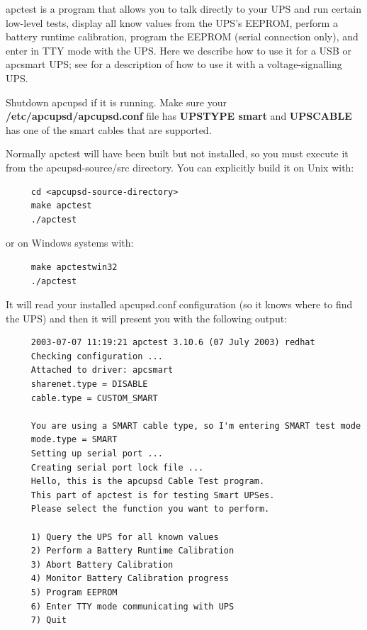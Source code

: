 {{\label{index-apctest-100}
apctest is a program that allows you to talk directly to your UPS and run
certain low-level tests, display all know values from the UPS's EEPROM,
perform a battery runtime calibration, program the EEPROM (serial connection
only), and enter in TTY mode with the UPS. Here we describe how to use it for
a USB or apcsmart UPS; see 
 for a description
of how to use it with a voltage-signalling UPS.  

Shutdown apcupsd if it is running. Make sure your {\bf
/etc/apcupsd/apcupsd.conf} file has {\bf UPSTYPE smart} and {\bf UPSCABLE} has
one of the smart cables that are supported.  

Normally apctest will have been built but not installed, so you must execute
it from the \lt{}apcupsd-source\gt{}/src directory. You can explicitly build
it on Unix with: 

\footnotesize
\begin{verbatim}
     cd <apcupsd-source-directory>
     make apctest
     ./apctest
\end{verbatim}
\normalsize

or on Windows systems with: 

\footnotesize
\begin{verbatim}
     make apctestwin32
     ./apctest
\end{verbatim}
\normalsize

It will read your installed apcupsd.conf configuration (so it knows where to
find the UPS) and then it will present you with the following output: 

\footnotesize
\begin{verbatim}
     2003-07-07 11:19:21 apctest 3.10.6 (07 July 2003) redhat
     Checking configuration ...
     Attached to driver: apcsmart
     sharenet.type = DISABLE
     cable.type = CUSTOM_SMART
     
     You are using a SMART cable type, so I'm entering SMART test mode
     mode.type = SMART
     Setting up serial port ...
     Creating serial port lock file ...
     Hello, this is the apcupsd Cable Test program.
     This part of apctest is for testing Smart UPSes.
     Please select the function you want to perform.
     
     1) Query the UPS for all known values
     2) Perform a Battery Runtime Calibration
     3) Abort Battery Calibration
     4) Monitor Battery Calibration progress
     5) Program EEPROM
     6) Enter TTY mode communicating with UPS
     7) Quit
     

\end{verbatim}}}
